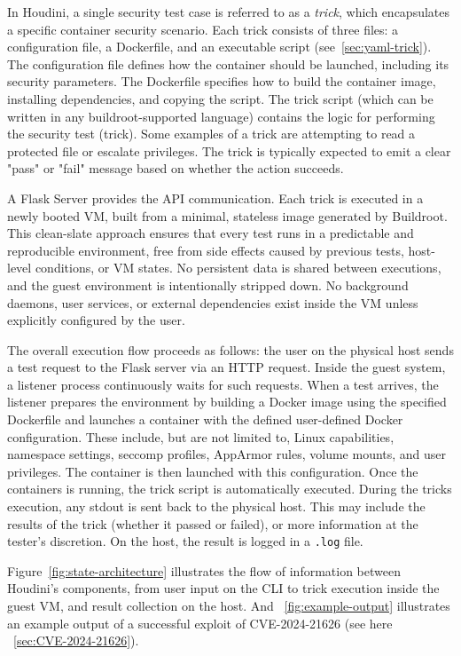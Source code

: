 \begin{doublespace}
In Houdini, a single security test case is referred to as a \textit{trick}, which encapsulates a specific container security scenario. Each trick consists of three files: a configuration file, a Dockerfile, and an executable script (see~\ref{sec:yaml-trick}). The configuration file defines how the container should be launched, including its security parameters. The Dockerfile specifies how to build the container image, installing dependencies, and copying the script. The trick script (which can be written in any buildroot-supported language) contains the logic for performing the security test (trick). Some examples of a trick are attempting to read a protected file or escalate privileges. The trick is typically expected to emit a clear "pass" or "fail" message based on whether the action succeeds.

A \gls{Flask Server} provides the API communication. Each trick is executed in a newly booted VM, built from a minimal, stateless image generated by Buildroot. This clean-slate approach ensures that every test runs in a predictable and reproducible environment, free from side effects caused by previous tests, host-level conditions, or VM states. No persistent data is shared between executions, and the guest environment is intentionally stripped down. No background daemons, user services, or external dependencies exist inside the VM unless explicitly configured by the user.

The overall execution flow proceeds as follows: the user on the physical host sends a test request to the Flask server via an HTTP request. Inside the guest system, a listener process continuously waits for such requests. When a test arrives, the listener prepares the environment by building a Docker image using the specified Dockerfile and launches a container with the defined user-defined Docker configuration. These include, but are not limited to, Linux capabilities, namespace settings, seccomp profiles, AppArmor rules, volume mounts, and user privileges. The container is then launched with this configuration. Once the \glspl{container} is running, the trick script is automatically executed. During the tricks execution, any stdout is sent back to the physical host. This may include the results of the trick (whether it passed or failed), or more information at the tester's discretion. On the host, the result is logged in a \texttt{.log} file.

Figure~\ref{fig:state-architecture} illustrates the flow of information between Houdini's components, from user input on the CLI to trick execution inside the guest VM, and result collection on the host. And ~\ref{fig:example-output} illustrates an example output of a successful exploit of CVE-2024-21626 (see here ~\ref{sec:CVE-2024-21626}).



\end{doublespace}
